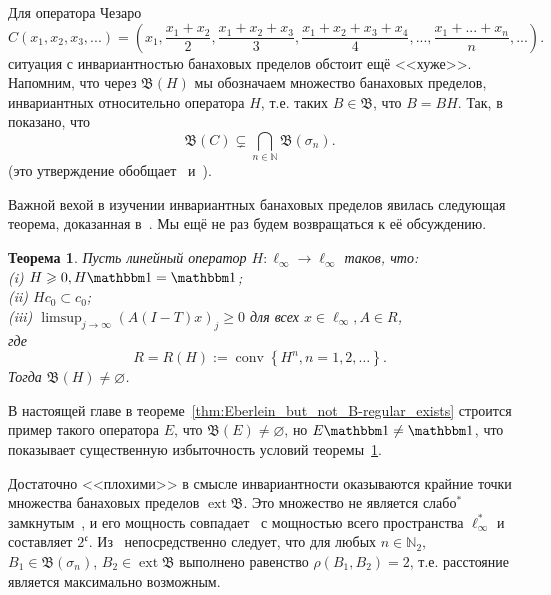 \documentclass[a4paper,14pt]{article} %
\DeclareMathOperator{\ext}{ext}
\newcommand{\N}{\ensuremath{\mathbb{N}}}
\newcommand{\B}{\ensuremath{\mathfrak{B}}}
\newcommand{\one}{\ensuremath{\mathbbm 1}}
\theoremstyle{plain}
\newtheorem{theorem}[lemma]{Теорема}
\begin{document}
Для оператора Чезаро
\begin{equation}
	C (x_1, x_2, x_3, ...) = \left(
	x_1,
	\dfrac{x_1+x_2}2,
	\dfrac{x_1+x_2 + x_3}3,
	\dfrac{x_1+x_2+x_3+x_4}4,
	...,
	\dfrac{x_1+...+x_n}n,
	...\right)
	.
\end{equation}
ситуация с инвариантностью банаховых пределов обстоит ещё <<хуже>>.
Напомним, что через $\B(H)$ мы обозначаем множество банаховых пределов,
инвариантных относительно оператора $H$,
т.е. таких $B\in \B$, что $B=BH$.
Так, в~\cite[\S2, Theorem 4]{semenov2020dilation} показано, что
\begin{equation}
	\label{eq:B_C_subsetneq_B_sigma_n}
	\B(C) \subsetneq \bigcap_{n\in \N}\B(\sigma_n)
	.
\end{equation}
(это утверждение обобщает~\cite[Theorem 3]{semenov2020invariant_noncommutative}
и~\cite[Theorem 4.8]{ASSU4}).

Важной вехой в изучении инвариантных банаховых пределов явилась следующая теорема,
доказанная в~\cite[\S2]{Semenov2010invariant}.
Мы ещё не раз будем возвращаться к её обсуждению.

\begin{theorem}
	\label{thm:Semenov_Sukochev_conditions}
	Пусть линейный оператор $H:\ell_\infty\to\ell_\infty$ таков, что:
	\\(i)   $H \geqslant 0, H \one=\one$;
	\\(ii)  $H c_0 \subset c_0$;
	\\(iii) $\limsup _{j \rightarrow \infty}(A(I-T) x)_j \geqslant 0$ для всех $x \in \ell_{\infty}, A \in R$,
	\\где
	\begin{equation}
		R=R(H):=\operatorname{conv}\left\{H^n, n=1,2, \ldots\right\}
		.
	\end{equation}
	Тогда $\B(H) \ne\varnothing$.
\end{theorem}

В настоящей главе в теореме~\ref{thm:Eberlein_but_not_B-regular_exists}
строится пример такого оператора $E$, что $\B(E)\ne\varnothing$,
но $E\one \ne \one$, что показывает существенную избыточность условий теоремы~\ref{thm:Semenov_Sukochev_conditions}.


Достаточно <<плохими>> в смысле инвариантности оказываются крайние точки множества банаховых пределов $\ext \B$.
Это множество не является слабо$^*$ замкнутым~\cite{Nillsen,Talagrand},
и его мощность совпадает~\cite{Chou} с мощностью всего пространства $\ell_\infty^*$
и составляет $2^{\mathfrak c}$.
Из~\cite[Corollary 6]{semenov2020dilation} непосредственно следует, что для любых
$n\in\N_2$, $B_1 \in \B(\sigma_n)$, $B_2 \in \ext\B$ выполнено равенство
$\rho(B_1,B_2) = 2$, т.е. расстояние является максимально возможным.
\end{document}
